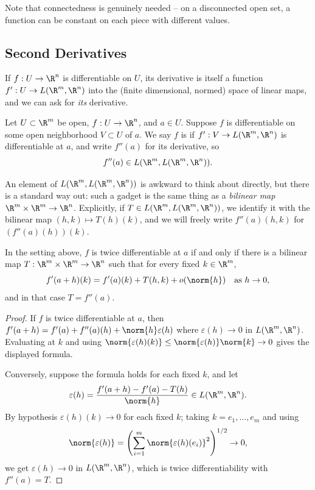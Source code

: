 Note that connectedness is genuinely needed -- on a disconnected open set, a function can be constant on each piece with different values.

\subsection{Second Derivatives}

If $f: U \rightarrow \R^n$ is differentiable on $U$, its derivative is itself a function $f': U \rightarrow L(\R^m, \R^n)$ into the (finite dimensional, normed) space of linear maps, and we can ask for \emph{its} derivative.

\begin{definition}
    Let $U \subset \R^m$ be open, $f: U \rightarrow \R^n$, and $a \in U$. Suppose $f$ is differentiable on some open neighborhood $V \subset U$ of $a$. We say $f$ is  if $f': V \rightarrow L(\R^m, \R^n)$ is differentiable at $a$, and write $f''(a)$ for its derivative, so
    $$
    f''(a) \in L(\R^m, L(\R^m, \R^n)).
    $$
\end{definition}

An element of $L(\R^m, L(\R^m, \R^n))$ is awkward to think about directly, but there is a standard way out: such a gadget is the same thing as a \emph{bilinear map} $\R^m \times \R^m \rightarrow \R^n$. Explicitly, if $T \in L(\R^m, L(\R^m, \R^n))$, we identify it with the bilinear map $(h, k) \mapsto T(h)(k)$, and we will freely write $f''(a)(h, k)$ for $\left(f''(a)(h)\right)(k)$.

\begin{proposition}
    In the setting above, $f$ is twice differentiable at $a$ if and only if there is a bilinear map $T: \R^m \times \R^m \rightarrow \R^n$ such that for every fixed $k \in \R^m$,
    $$
    f'(a + h)(k) = f'(a)(k) + T(h, k) + o(\norm{h}) \quad \text{as } h \rightarrow 0,
    $$
    and in that case $T = f''(a)$.
\end{proposition}
\begin{proof}
    If $f$ is twice differentiable at $a$, then $f'(a + h) = f'(a) + f''(a)(h) + \norm{h}\varepsilon(h)$ where $\varepsilon(h) \rightarrow 0$ in $L(\R^m, \R^n)$. Evaluating at $k$ and using $\norm{\varepsilon(h)(k)} \leq \norm{\varepsilon(h)}\norm{k} \rightarrow 0$ gives the displayed formula.

    Conversely, suppose the formula holds for each fixed $k$, and let
    $$
    \varepsilon(h) = \frac{f'(a + h) - f'(a) - T(h)}{\norm{h}} \in L(\R^m, \R^n).
    $$
    By hypothesis $\varepsilon(h)(k) \rightarrow 0$ for each fixed $k$; taking $k = e_1, \dots, e_m$ and using
    $$
    \norm{\varepsilon(h)} = \left(\sum_{i = 1}^m \norm{\varepsilon(h)(e_i)}^2\right)^{1/2} \rightarrow 0,
    $$
    we get $\varepsilon(h) \rightarrow 0$ in $L(\R^m, \R^n)$, which is twice differentiability with $f''(a) = T$.
\end{proof}

